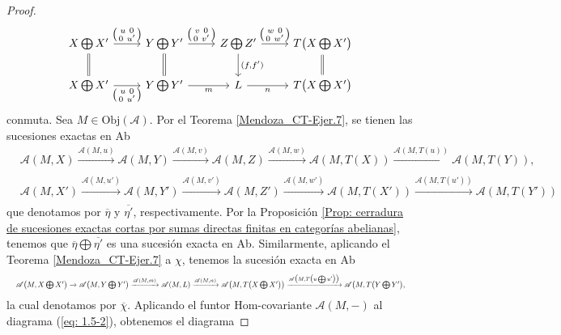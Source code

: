 \documentclass[tesis]{subfiles}
\begin{document}
\begin{proof}
\begin{equation}
\begin{tikzcd}
            X\bigoplus X' \arrow[equals]{d}[]{} \arrow[]{r}[]{\big(\begin{smallmatrix} u \ 0 \\ 0 \ u' \end{smallmatrix}\big)} &Y\bigoplus Y' \arrow[equals]{d}[]{} \arrow[]{r}[]{\big(\begin{smallmatrix} v \ 0 \\ 0 \ v' \end{smallmatrix}\big)} &Z\bigoplus Z' \arrow[]{d}[]{(f, f')} \arrow[]{r}[]{\big(\begin{smallmatrix} w \ 0 \\ 0 \ w' \end{smallmatrix}\big)} &T\big(X\bigoplus X'\big) \arrow[equals]{d}[]{} \\
            X\bigoplus X' \arrow[]{r}[swap]{\big(\begin{smallmatrix} u \ 0 \\ 0 \ u' \end{smallmatrix}\big)} &Y\bigoplus Y' \arrow[]{r}[swap]{m} &L \arrow[]{r}[swap]{n} &T\big(X\bigoplus X'\big)
        \end{tikzcd}
    \end{equation}
    conmuta. Sea $M\in\text{Obj}(\mathscr{A})$. Por el Teorema \ref{Mendoza_CT-Ejer.7}, se tienen las sucesiones exactas en Ab
    \begin{align*}
        &\mathscr{A}(M,X)\xrightarrow[]{\mathscr{A}(M,u)} \mathscr{A}(M,Y)\xrightarrow[]{\mathscr{A}(M,v)} \mathscr{A}(M,Z)\xrightarrow[]{\mathscr{A}(M,w)} \mathscr{A}(M,T(X))\xrightarrow[]{\mathscr{A}(M,T(u))} \mathscr{A}(M,T(Y)), \\
        &\mathscr{A}(M,X')\xrightarrow[]{\mathscr{A}(M,u')} \mathscr{A}(M,Y')\xrightarrow[]{\mathscr{A}(M,v')} \mathscr{A}(M,Z')\xrightarrow[]{\mathscr{A}(M,w')} \mathscr{A}(M,T(X'))\xrightarrow[]{\mathscr{A}(M,T(u'))} \mathscr{A}(M,T(Y'))
    \end{align*}
    que denotamos por $\overline{\eta}$ y $\overline{\eta'}$, respectivamente. Por la Proposición \ref{Prop: cerradura de sucesiones exactas cortas por sumas directas finitas en categorías abelianas}, tenemos que $\overline{\eta}\bigoplus \overline{\eta'}$ es una sucesión exacta en Ab. Similarmente, aplicando el Teorema \ref{Mendoza_CT-Ejer.7} a $\chi$, tenemos la sucesión exacta en Ab
    \begin{equation*}
        \resizebox{\hsize}{!}{$\mathscr{A}\big(M,X\bigoplus X'\big)\xrightarrow[]{} \mathscr{A}\big(M, Y\bigoplus Y'\big)\xrightarrow[]{\mathscr{A}(M,m)} \mathscr{A}(M,L)\xrightarrow[]{\mathscr{A}(M,n)} \mathscr{A}\big(M,T\big(X\bigoplus X'\big)\big)\xrightarrow[]{\mathscr{A}\big(M,T\big(u\bigoplus u'\big)\big)} \mathscr{A}\big(M,T\big(Y\bigoplus Y'\big)$,}
    \end{equation*}
    la cual denotamos por $\overline{\chi}$. Aplicando el funtor Hom-covariante $\mathscr{A}(M,-)$ al diagrama (\ref{eq: 1.5-2}), obtenemos el diagrama


\end{proof}
\end{document}
